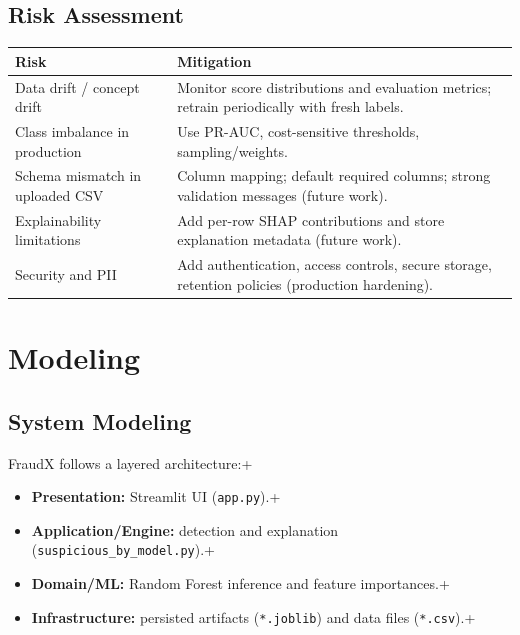 \documentclass[12pt,a4paper]{report}
\begin{document}
\section{Risk Assessment}
\begin{longtable}{p{3cm}p{10cm}}
\toprule
\textbf{Risk} & \textbf{Mitigation} \\\midrule
Data drift / concept drift & Monitor score distributions and evaluation metrics; retrain periodically with fresh labels.\\
Class imbalance in production & Use PR-AUC, cost-sensitive thresholds, sampling/weights.\\
Schema mismatch in uploaded CSV & Column mapping; default required columns; strong validation messages (future work).\\
Explainability limitations & Add per-row SHAP contributions and store explanation metadata (future work).\\
Security and PII & Add authentication, access controls, secure storage, retention policies (production hardening).\\
\bottomrule
\end{longtable}

\chapter{Modeling}
\section{System Modeling}
FraudX follows a layered architecture:\n+\begin{itemize}
  \item \textbf{Presentation:} Streamlit UI (\texttt{app.py}).\n+  \item \textbf{Application/Engine:} detection and explanation (\texttt{suspicious\_by\_model.py}).\n+  \item \textbf{Domain/ML:} Random Forest inference and feature importances.\n+  \item \textbf{Infrastructure:} persisted artifacts (\texttt{*.joblib}) and data files (\texttt{*.csv}).\n+\end{itemize}
\end{document}
